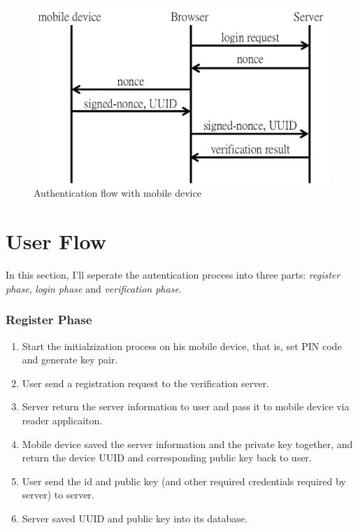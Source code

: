\begin{CJK}{Bg5}{bsmi}
\begin{figure}
\centering
\label{fig:final-flow}
\includegraphics[scale=0.65]{picture/final-flow.png}
\caption{Authentication flow with mobile device}
\end{figure}

\section{User Flow}

In this section, I'll seperate the autentication process into three parts: \emph{register phase}, \emph{login phase} and \emph{verification phase}.

\subsubsection{Register Phase}

\begin{enumerate}
\item Start the initialzization process on his mobile device, that is, set PIN code and generate key pair.
\item User send a registration request to the verification server.
\item Server return the server information to user and pass it to mobile device via reader applicaiton.
\item Mobile device saved the server information and the private key together, and return the device UUID and corresponding public key back to user.
\item User send the id and public key (and other required credentials required by server) to server.
\item Server saved UUID and public key into its database.
\end{enumerate}


\end{CJK}
